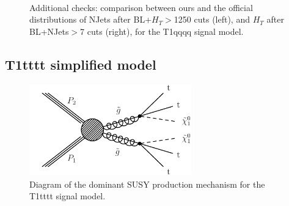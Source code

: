         \begin{figure}
        \centering
        \hspace{-1 cm}
        ~ %
        \caption{Additional checks: comparison between ours and the official distributions of NJets after BL+$H_T$$>$1250 cuts (left), and $H_T$ after BL+NJets$>$7 cuts (right), for the T1qqqq signal model.}
        \end{figure}        

\clearpage
\subsection{T1tttt simplified model}

\begin{figure}[h!]
\centering
\includegraphics[width=7cm]{figures/Appendices/Ma5ValidationSUS13012/T1tttt.pdf}
\caption{Diagram of the dominant SUSY production mechanism
for the T1tttt signal model.}
\label{fig:T1tttt}
\end{figure}

